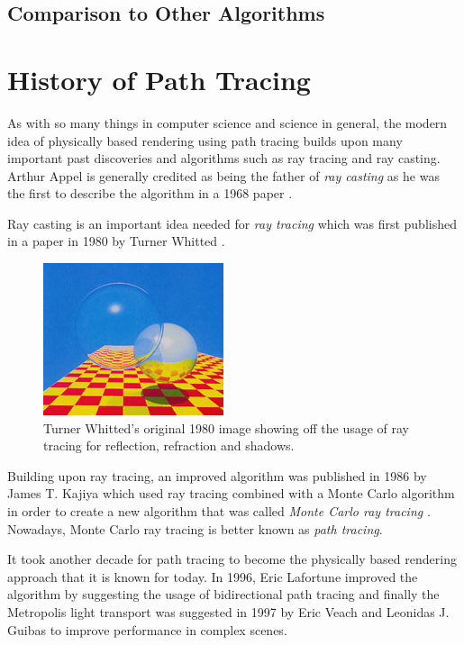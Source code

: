\documentclass[
  twoside,
  11pt, a4paper,
  footinclude=true,
  headinclude=true,
  cleardoublepage=empty
]{scrreprt}
\begin{document}
\subsection{Comparison to Other Algorithms}

\section{History of Path Tracing}
As with so many things in computer science and science in general, the modern idea of physically
based rendering using path tracing builds upon many important past discoveries and algorithms
such as ray tracing and ray casting.
Arthur Appel is generally credited as being the father of
\emph{ray casting} as he was the first to describe the algorithm in a 1968 paper
\cite{inproceedings:raycasting}.

Ray casting is an important idea needed for \emph{ray tracing} which was
first published in a paper in 1980 by Turner Whitted \cite{article:raytracing}.

\begin{figure}[h]
    \includegraphics{early-raytracing-whitted}
    \centering
    \caption{Turner Whitted's original 1980 \cite{article:raytracing} image showing off the usage of ray tracing for
    reflection, refraction and shadows.}
    \label{fig:early-raytracing-whitted}
\end{figure}

Building upon ray tracing, an improved algorithm was published in 1986 by James T. Kajiya which used ray tracing
combined with a Monte Carlo algorithm in order to create a new algorithm that was called \emph{Monte
Carlo ray tracing} \cite{inproceedings:pathtracing}. Nowadays, Monte Carlo ray tracing is better
known as \emph{path tracing}.

It took another decade for path tracing to become the
physically based rendering approach that it is known for today. In 1996, Eric Lafortune improved
the algorithm by suggesting the usage of bidirectional path tracing \cite{techreport:pbr} and
finally the Metropolis light transport was suggested in 1997 by Eric Veach and Leonidas J. Guibas \cite{inproceedings:metropolis} to
improve performance in complex scenes.
\end{document}
